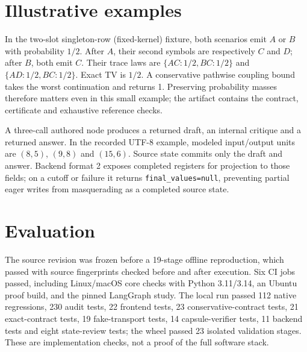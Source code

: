 \documentclass[preprint,12pt,a4paper]{elsarticle}
\newcommand{\codepath}[1]{\nolinkurl{#1}}
\begin{document}
\section{Illustrative examples}
In the two-slot singleton-row (fixed-kernel) fixture, both scenarios emit $A$ or $B$ with probability $1/2$. After $A$, their second symbols are respectively $C$ and $D$; after $B$, both emit $C$. Their trace laws are $\{AC:1/2,BC:1/2\}$ and $\{AD:1/2,BC:1/2\}$. Exact TV is $1/2$. A conservative pathwise coupling bound takes the worst continuation and returns 1. Preserving probability masses therefore matters even in this small example; the artifact contains the contract, certificate and exhaustive reference checks.

A three-call authored node produces a returned draft, an internal critique and a returned answer. In the recorded UTF-8 example, modeled input/output units are $(8,5)$, $(9,8)$ and $(15,6)$. Source state commits only the draft and answer. Backend format 2 exposes completed registers for projection to those fields; on a cutoff or failure it returns \codepath{final_values=null}, preventing partial eager writes from masquerading as a completed source state.

\section{Evaluation}
The source revision was frozen before a 19-stage offline reproduction, which passed with source fingerprints checked before and after execution. Six CI jobs passed, including Linux/macOS core checks with Python 3.11/3.14, an Ubuntu proof build, and the pinned LangGraph study. The local run passed 112 native regressions, 230 audit tests, 22 frontend tests, 23 conservative-contract tests, 21 exact-contract tests, 19 fake-transport tests, 14 capsule-verifier tests, 11 backend tests and eight state-review tests; the wheel passed 23 isolated validation stages. These are implementation checks, not a proof of the full software stack.
\end{document}
